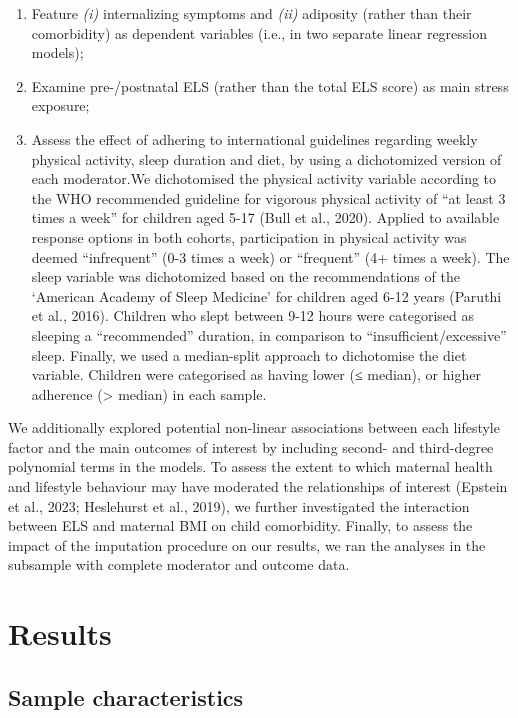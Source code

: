 \documentclass[
  letterpaper,
  DIV=11,
  numbers=noendperiod]{scrreport}
\providecommand{\tightlist}{%
  \setlength{\itemsep}{0pt}\setlength{\parskip}{0pt}}
\begin{document}
\begin{enumerate}
\def\labelenumi{\alph{enumi})}
\tightlist
\item
  Feature \emph{(i)} internalizing symptoms and \emph{(ii)} adiposity
  (rather than their comorbidity) as dependent variables (i.e., in two
  separate linear regression models);
\item
  Examine pre-/postnatal ELS (rather than the total ELS score) as main
  stress exposure;
\item
  Assess the effect of adhering to international guidelines regarding
  weekly physical activity, sleep duration and diet, by using a
  dichotomized version of each moderator.We dichotomised the physical
  activity variable according to the WHO recommended guideline for
  vigorous physical activity of ``at least 3 times a week'' for children
  aged 5-17 (Bull et al., 2020). Applied to available response options
  in both cohorts, participation in physical activity was deemed
  ``infrequent'' (0-3 times a week) or ``frequent'' (4+ times a week).
  The sleep variable was dichotomized based on the recommendations of
  the `American Academy of Sleep Medicine' for children aged 6-12 years
  (Paruthi et al., 2016). Children who slept between 9-12 hours were
  categorised as sleeping a ``recommended'' duration, in comparison to
  ``insufficient/excessive'' sleep. Finally, we used a median-split
  approach to dichotomise the diet variable. Children were categorised
  as having lower (≤ median), or higher adherence (\textgreater{}
  median) in each sample.
\end{enumerate}

We additionally explored potential non-linear associations between each
lifestyle factor and the main outcomes of interest by including second-
and third-degree polynomial terms in the models. To assess the extent to
which maternal health and lifestyle behaviour may have moderated the
relationships of interest (Epstein et al., 2023; Heslehurst et al.,
2019), we further investigated the interaction between ELS and maternal
BMI on child comorbidity. Finally, to assess the impact of the
imputation procedure on our results, we ran the analyses in the
subsample with complete moderator and outcome data.

\section{Results}\label{results-1}

\subsection{Sample characteristics}\label{sample-characteristics}
\end{document}
